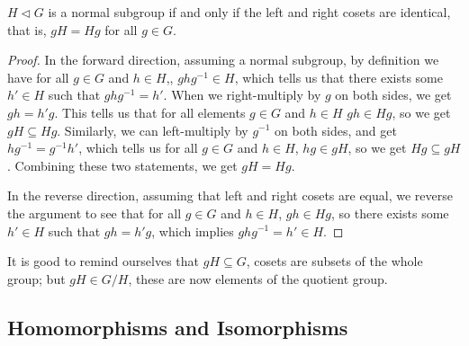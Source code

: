 \begin{theorem}\label{thm:equal-coset-normal}
    \(H \lhd G\) is a normal subgroup if and only if
    the left and right cosets are identical, that is,
    \(gH = Hg\) for all \(g \in G\).
\end{theorem}
\begin{proof}
    In the forward direction,
    assuming a normal subgroup,
    by definition we have for all \(g \in G\) and \(h \in H\),,
    \(ghg^{-1} \in H\),
    which tells us that there exists some \(h' \in H\)
    such that \(ghg^{-1} = h'\).
    When we right-multiply by \(g\) on both sides,
    we get \(gh = h'g\).
    This tells us that for all elements \(g \in G\) and \(h \in H\)
    \(gh \in Hg\), so we get \(gH \subseteq Hg\).
    Similarly, we can left-multiply by \(g^{-1}\) on both sides,
    and get \(hg^{-1} = g^{-1}h'\),
    which tells us for all \(g \in G\) and \(h \in H\),
    \(hg \in gH\), so we get \(Hg \subseteq gH\).
    Combining these two statements, we get \(gH = Hg\).

    In the reverse direction,
    assuming that left and right cosets are equal,
    we reverse the argument to see that
    for all \(g \in G\) and \(h \in H\),
    \(gh \in Hg\), so there exists some \(h' \in H\)
    such that \(gh = h'g\), which implies \(ghg^{-1} = h' \in H\).
\end{proof}

\begin{remark}
    It is good to remind ourselves that
    \(gH \subseteq G\), cosets are subsets of the whole group;
    but \(gH \in G/H\), these are now elements of the quotient group.
\end{remark}


\subsection{Homomorphisms and Isomorphisms}



